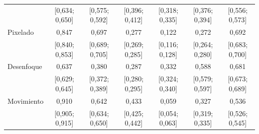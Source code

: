 \begin{table}
\begin{tabular*}{\linewidth}{@{\extracolsep{\fill}}lcccccc}
& {\tiny [0{,}634; 0{,}650]} & {\tiny [0{,}575; 0{,}592]} & {\tiny [0{,}396; 0{,}412]} & {\tiny [0{,}318; 0{,}335]} & {\tiny [0{,}376; 0{,}394]} & {\tiny [0{,}556; 0{,}573]} \\[2pt]
Pixelado & 0{,}847 & 0{,}697 & 0{,}277 & 0{,}122 & 0{,}272 & 0{,}692 \\
& {\tiny [0{,}840; 0{,}853]} & {\tiny [0{,}689; 0{,}705]} & {\tiny [0{,}269; 0{,}285]} & {\tiny [0{,}116; 0{,}128]} & {\tiny [0{,}264; 0{,}280]} & {\tiny [0{,}683; 0{,}700]} \\[2pt]
Desenfoque & 0{,}637 & 0{,}380 & 0{,}287 & 0{,}332 & 0{,}588 & 0{,}681 \\
& {\tiny [0{,}629; 0{,}645]} & {\tiny [0{,}372; 0{,}389]} & {\tiny [0{,}280; 0{,}295]} & {\tiny [0{,}324; 0{,}340]} & {\tiny [0{,}579; 0{,}597]} & {\tiny [0{,}673; 0{,}689]} \\[2pt]
Movimiento & 0{,}910 & 0{,}642 & 0{,}433 & 0{,}059 & 0{,}327 & 0{,}536 \\
& {\tiny [0{,}905; 0{,}915]} & {\tiny [0{,}634; 0{,}650]} & {\tiny [0{,}425; 0{,}442]} & {\tiny [0{,}054; 0{,}063]} & {\tiny [0{,}319; 0{,}335]} & {\tiny [0{,}526; 0{,}545]} \\[2pt]
\bottomrule
\end{tabular*}
\end{table}

